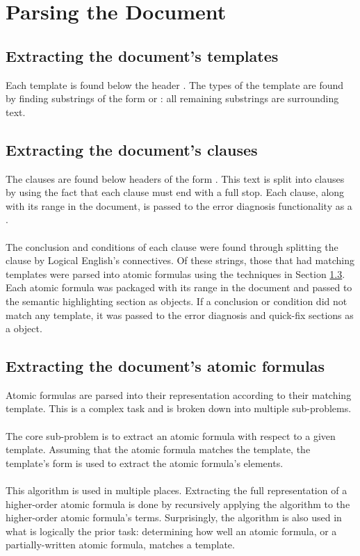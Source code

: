 \documentclass[../main.tex]{subfiles}
\begin{document}
\section{Parsing the Document}
\subsection{Extracting the document's templates}
Each template is found below the header . The types of the template are found by finding substrings of the form  or : all remaining substrings are surrounding text.

\subsection{Extracting the document's clauses}
The clauses are found below headers of the form . This text is split into clauses by using the fact that each clause must end with a full stop. Each clause, along with its range in the document, is passed to the error diagnosis functionality as a .
\\
\\
The conclusion and conditions of each clause were found through splitting the clause by Logical English's connectives. Of these strings, those that had matching templates were parsed into atomic formulas using the techniques in Section \ref{section:extract-atomic-formulas}. Each atomic formula was packaged with its range in the document and passed to the semantic highlighting section as  objects. If a conclusion or condition did not match any template, it was passed to the error diagnosis and quick-fix sections as a  object.

\subsection{Extracting the document's atomic formulas}
\label{section:extract-atomic-formulas}
Atomic formulas are parsed into their  representation according to their matching template. This is a complex task and is broken down into multiple sub-problems.
\\
\\
The core sub-problem is to extract an atomic formula with respect to a given template. Assuming that the atomic formula matches the template, the template's form is used to extract the atomic formula's elements.
\\
\\
This algorithm is used in multiple places. Extracting the full representation of a higher-order atomic formula is done by recursively applying the algorithm to the higher-order atomic formula's terms. Surprisingly, the algorithm is also used in what is logically the prior task: determining how well an atomic formula, or a partially-written atomic formula, matches a template.
\end{document}
